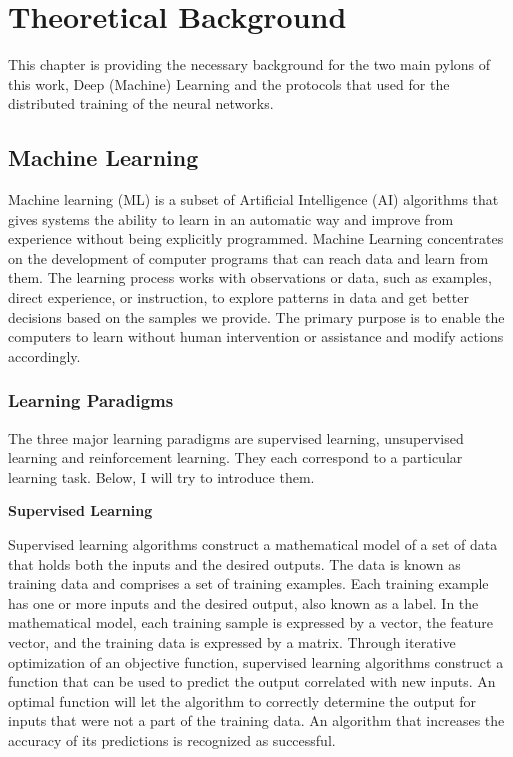 \chapter{Theoretical Background}\label{ch:theoretical-background}

This chapter is providing the necessary background for the two main pylons of this work, Deep (Machine) Learning and the
protocols that used for the distributed training of the neural networks.


\section{Machine Learning}\label{sec:machine-learning}

Machine learning (ML) is a subset of Artificial Intelligence (AI) algorithms that gives systems the ability to learn in
an automatic way and improve from experience without
being explicitly programmed.
Machine Learning concentrates on the development of computer programs that can reach data and learn from them.
The learning process works with observations or data, such as examples, direct experience, or instruction, to explore
patterns in data and get better decisions based on the
samples we provide.
The primary purpose is to enable the computers to learn without human intervention or assistance
and modify actions accordingly.

\subsection{Learning Paradigms}\label{subsec:learning-paradigms}

The three major learning paradigms are supervised learning, unsupervised learning and reinforcement learning.
They each correspond to a particular learning task.
Below, I will try to introduce them.

\newpage

{\large \textbf{Supervised Learning}}

Supervised learning algorithms construct a mathematical model of a set of data that holds both the
inputs and the desired outputs.
The data is known as training data and comprises a set of training examples.
Each training example has one or more inputs and the desired output, also known as a label.
In the mathematical model, each training sample is expressed by a vector, the feature vector,
and the training data is expressed by a matrix.
Through iterative optimization of an objective function, supervised learning algorithms construct a function that
can be used to predict the output correlated with new inputs.
An optimal function will let the algorithm to correctly determine the output for inputs that were
not a part of the training data.
An algorithm that increases the accuracy of its predictions is recognized as successful.

